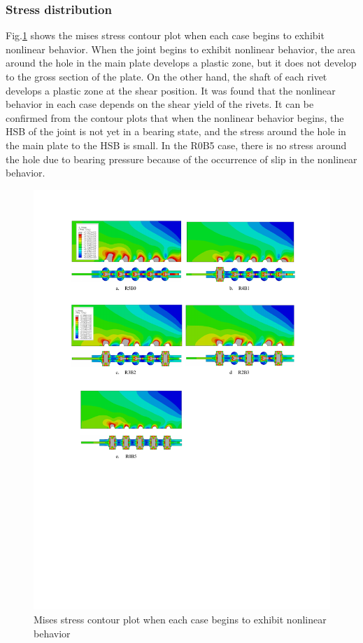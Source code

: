 \subsubsection{Stress distribution}

Fig.\ref{fig-5rslscount} shows the mises stress contour plot when each case begins to exhibit nonlinear behavior. When the joint begins to exhibit nonlinear behavior, the area around the hole in the main plate develops a plastic zone, but it does not develop to the gross section of the plate. On the other hand, the shaft of each rivet develops a plastic zone at the shear position. It was found that the nonlinear behavior in each case depends on the shear yield of the rivets. It can be confirmed from the contour plots that when the nonlinear behavior begins, the \ac{HSB} of the joint is not yet in a bearing state, and the stress around the hole in the main plate to the HSB is small. In the R0B5 case, there is no stress around the hole due to bearing pressure because of the occurrence of slip in the nonlinear behavior.

\begin{figure}[htbp]
    \centering
    \includegraphics[width=1\linewidth]{imgs//ch4/fig-5rslscount.pdf}
    \caption{Mises stress contour plot when each case begins to exhibit nonlinear behavior}
    \label{fig-5rslscount}
\end{figure}


